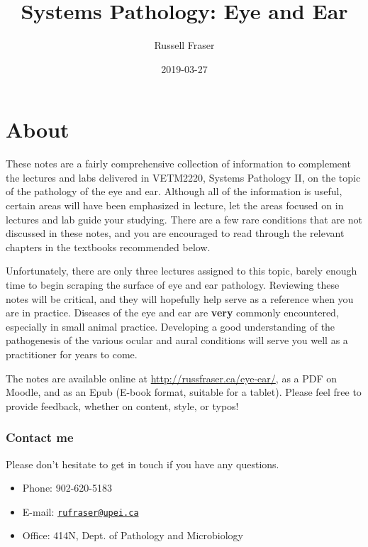 \documentclass[openany]{book}
\title{Systems Pathology: Eye and Ear}
\author{Russell Fraser}
\date{2019-03-27}
\providecommand{\tightlist}{%
  \setlength{\itemsep}{0pt}\setlength{\parskip}{0pt}}
\begin{document}
\maketitle

{
\setcounter{tocdepth}{1}
\tableofcontents
}
\chapter*{About}\label{about}

These notes are a fairly comprehensive collection of information to
complement the lectures and labs delivered in VETM2220, Systems
Pathology II, on the topic of the pathology of the eye and ear. Although
all of the information is useful, certain areas will have been
emphasized in lecture, let the areas focused on in lectures and lab
guide your studying. There are a few rare conditions that are not
discussed in these notes, and you are encouraged to read through the
relevant chapters in the textbooks recommended below.

Unfortunately, there are only three lectures assigned to this topic,
barely enough time to begin scraping the surface of eye and ear
pathology. Reviewing these notes will be critical, and they will
hopefully help serve as a reference when you are in practice. Diseases
of the eye and ear are \textbf{very} commonly encountered, especially in
small animal practice. Developing a good understanding of the
pathogenesis of the various ocular and aural conditions will serve you
well as a practitioner for years to come.

The notes are available online at \url{http://russfraser.ca/eye-ear/},
as a PDF on Moodle, and as an Epub (E-book format, suitable for a
tablet). Please feel free to provide feedback, whether on content,
style, or typos!

\subsection*{Contact me}\label{contact-me}

Please don't hesitate to get in touch if you have any questions.

\begin{itemize}
\tightlist
\item
  Phone: 902-620-5183
\item
  E-mail: \href{mailto:rufraser@upei.ca}{\nolinkurl{rufraser@upei.ca}}
\item
  Office: 414N, Dept. of Pathology and Microbiology
\end{itemize}
\end{document}
